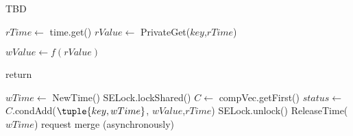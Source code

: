 \begin{algorithm} [th!]
\small
\caption{\small  TBD }
\label{alg:client}

\begin{algorithmic}[1]
\makeatletter\setcounter{ALG@line}{0}\makeatother


    \State $rTime \gets$ time.get() \label{beginRMW}
    \State $rValue \gets$ PrivateGet($key$,$rTime$)

    \State $wValue \gets f(rValue)$

       \State  return
     \EndIf

      \State $wTime \gets$ NewTime() \label{beginPut3}
     \State SELock.lockShared()
     \State $C \gets$ compVec.getFirst()
     \State $status \gets$ $C$.condAdd($\tuple{key,wTime}$, $wValue$,$rTime$)
     \State SELock.unlock()
     \State ReleaseTime($wTime$)
        \State {} 
     \EndIf
        \State request merge (asynchronously)
        \State {} 
     \EndIf



\EndProcedure
\end{algorithmic}
\end{algorithm}



